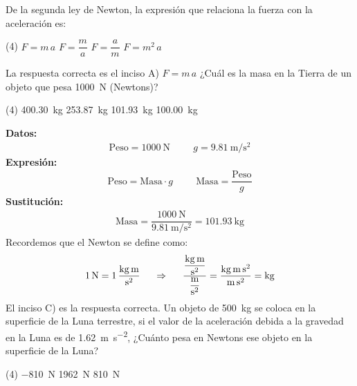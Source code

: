 \documentclass[12pt, letter]{exam}
\begin{document}
\begin{questions}
    \question De la segunda ley de Newton, la expresión que relaciona la fuerza con la aceleración es:
    \begin{tasks}(4)
        \task $F = m \, a$
        \task $F = \dfrac{m}{a}$
        \task $F = \dfrac{a}{m}$
        \task $F = m^{2} \, a$
    \end{tasks}
    La respuesta correcta es el inciso A) $F = m \, a$
    \question ¿Cuál es la masa en la Tierra de un objeto que pesa \SI{1000}{\newton} (Newtons)?
    \begin{tasks}(4)
        \task \SI{400.30}{\kilo\gram}
        \task \SI{253.87}{\kilo\gram}
        \task \SI{101.93}{\kilo\gram}
        \task \SI{100.00}{\kilo\gram}
    \end{tasks}
    \textbf{Datos:}
    \begin{align*}
    \text{Peso} = \SI{1000}{\newton} \hspace{1cm} g = \SI{9.81}{\meter\per\square\second}
    \end{align*}
    \textbf{Expresión:}
    \begin{align*}
    \text{Peso} = \text{Masa} \cdot g \hspace{1cm} \text{Masa} = \dfrac{\text{Peso}}{g}
    \end{align*}
    \textbf{Sustitución:}
    \begin{align*}
    \text{Masa} = \dfrac{\SI{1000}{\newton}}{\SI{9.81}{\meter\per\square\second}} = \SI{101.93}{\kilo\gram}
    \end{align*}
    Recordemos que el Newton se define como:
    \begin{align*}
    \SI{1}{\newton} = \SI[per-mode=fraction]{1}{\kilo\gram\meter\per\square\second} \hspace{0.5cm} \Rightarrow \hspace{0.5cm} \dfrac{\displaystyle \unit[per-mode=fraction]{\kilo\gram\meter\per\square\second}}{\displaystyle \unit[per-mode=fraction]{\meter\per\square\second}} = \dfrac{\unit{\kilo\gram\meter\square\second}}{\unit{\meter\square\second}} = \unit{\kilo\gram}
    \end{align*}
    El inciso C) es la respuesta correcta.
    \question Un objeto de \SI{500}{\kilo\gram} se coloca en la superficie de la Luna terrestre, si el valor de la aceleración debida a la gravedad en la Luna es de \SI{1.62}{\meter\per\square\second}, ¿Cuánto pesa en Newtons ese objeto en la superficie de la Luna?
    \begin{tasks}(4)
        \task \SI{-810}{\newton}
        \task \SI{1962}{\newton}
        \task \SI{810}{\newton}

\end{tasks}
\end{questions}
\end{document}

